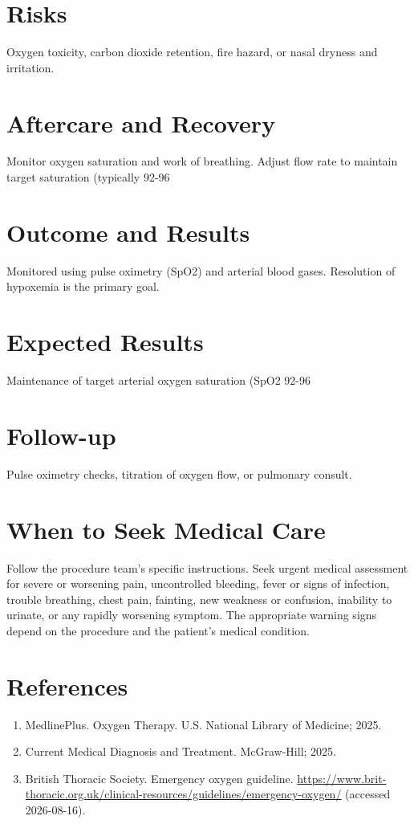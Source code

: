 \section*{Risks}
Oxygen toxicity, carbon dioxide retention, fire hazard, or nasal dryness and irritation.

\section*{Aftercare and Recovery}
Monitor oxygen saturation and work of breathing. Adjust flow rate to maintain target saturation (typically 92-96%

\section*{Outcome and Results}
Monitored using pulse oximetry (SpO2) and arterial blood gases. Resolution of hypoxemia is the primary goal.

\section*{Expected Results}
Maintenance of target arterial oxygen saturation (SpO2 92-96%

\section*{Follow-up}
Pulse oximetry checks, titration of oxygen flow, or pulmonary consult.

\section*{When to Seek Medical Care}
Follow the procedure team's specific instructions. Seek urgent medical assessment for severe or worsening pain, uncontrolled bleeding, fever or signs of infection, trouble breathing, chest pain, fainting, new weakness or confusion, inability to urinate, or any rapidly worsening symptom. The appropriate warning signs depend on the procedure and the patient's medical condition.

\section*{References}
\begin{enumerate}
  \item MedlinePlus. Oxygen Therapy. U.S. National Library of Medicine; 2025.
  \item Current Medical Diagnosis and Treatment. McGraw-Hill; 2025.
  \item British Thoracic Society. Emergency oxygen guideline. \url{https://www.brit-thoracic.org.uk/clinical-resources/guidelines/emergency-oxygen/} (accessed 2026-08-16).
\end{enumerate}

\clearpage
